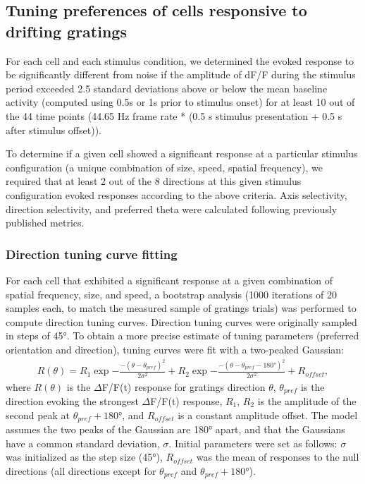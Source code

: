 \subsection{Tuning preferences of cells responsive to drifting gratings}
For each cell and each stimulus condition, we determined the evoked response to be significantly different from noise if the amplitude of dF/F during the stimulus period exceeded 2.5 standard deviations above or below the mean baseline activity (computed using 0.5s or 1s prior to stimulus onset) for at least 10 out of the 44 time points (44.65 Hz frame rate * (0.5 s stimulus presentation + 0.5 s after stimulus offset)).

To determine if a given cell showed a significant response at a particular stimulus configuration (a unique combination of size, speed, spatial frequency), we required that at least 2 out of the 8 directions at this given stimulus configuration evoked responses according to the above criteria. Axis selectivity, direction selectivity, and preferred theta were calculated following previously published metrics\cite{Liang2018}. 

\subsubsection{Direction tuning curve fitting}
For each cell that exhibited a significant response at a given combination of spatial frequency, size, and speed, a bootstrap analysis (1000 iterations of 20 samples each, to match the measured sample of gratings trials) was performed to compute direction tuning curves. Direction tuning curves were originally sampled in steps of \ang{45}. To obtain a more precise estimate of tuning parameters (preferred orientation and direction), tuning curves were fit with a two-peaked Gaussian\cite{Liang2018, Sun2016}:
\begin{align}
    R(\theta) = R_1 \exp{ - \frac{-(\theta-\theta_{pref})^2}{2\sigma^2} } + R_2 \exp{ - \frac{-(\theta-\theta_{pref}-\ang{180})^2}{2\sigma^2} } + R_{offset},
\end{align}
where $R(\theta)$ is the $\Delta$F/F(t) response for gratings direction $\theta$, $\theta_{pref}$ is the direction evoking the strongest $\Delta$F/F(t) response, $R_1$, $R_2$ is the amplitude of the second peak at $\theta_{pref} + \ang{180}$, and $R_{offset}$ is a constant amplitude offset. The model assumes the two peaks of the Gaussian are \ang{180} apart, and that the Gaussians have a common standard deviation, $\sigma$. Initial parameters were set as follows:  $\sigma$ was initialized as the step size (\ang{45}), $R_{offset}$ was the mean of responses to the null directions (all directions except for $\theta_{pref}$ and $\theta_{pref}+\ang{180}$). 

